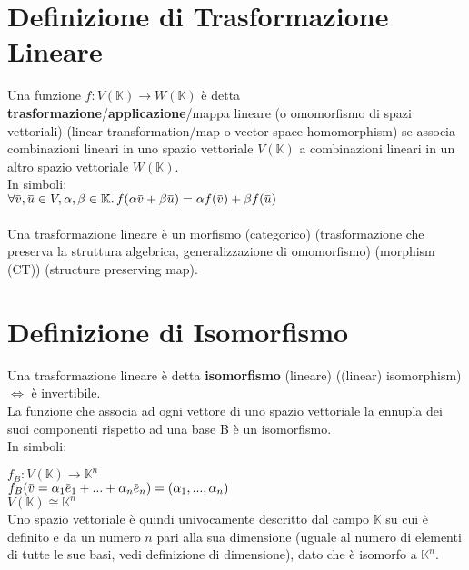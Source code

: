\documentclass[a4paper, twoside, italian, 11pt]{book}
\newcommand{\overbar}[1] {\mkern 1.5mu\overline{\mkern-1.5mu#1\mkern-1.5mu}\mkern 1.5mu}
\newcommand{\K}{\mathbb K}
\begin{document}



\section{Definizione di Trasformazione Lineare}

Una funzione $f : V(\K) \rightarrow W(\K)$ è detta \textbf{trasformazione}/\textbf{applicazione}/mappa lineare (o omomorfismo di spazi vettoriali) (linear transformation/map o vector space homomorphism) se associa combinazioni lineari in uno spazio vettoriale $V(\K)$ a combinazioni lineari in un altro spazio vettoriale $W(\K)$. \\

\noindent
In simboli: \\

$\forall \overbar v, \overbar u \in V, \alpha, \beta \in \K \ldotp f(\alpha \overbar v + \beta \overbar u) = \alpha f(\overbar v) + \beta f(\overbar u)$ \\\\

\noindent
Una trasformazione lineare è un morfismo (categorico) (trasformazione che preserva la struttura algebrica, generalizzazione di omomorfismo) (morphism (CT)) (structure preserving map).



\section{Definizione di Isomorfismo}

Una trasformazione lineare è detta \textbf{isomorfismo} (lineare) ((linear) isomorphism) $\iff$ è invertibile. \\

\noindent
La funzione che associa ad ogni vettore di uno spazio vettoriale la ennupla dei suoi componenti rispetto ad una base B è un isomorfismo. \\

\noindent
In simboli:

$f_B : V(\K) \rightarrow \K^n$ \\
\indent
$f_B(\overbar v = \alpha_1 \overbar e_1 + ... + \alpha_n \overbar e_n) = (\alpha_1, ..., \alpha_n)$ \\

$V(\K) \cong \K^n$ \\

\noindent
Uno spazio vettoriale è quindi univocamente descritto dal campo $\K$ su cui è definito e da un numero $n$ pari alla sua dimensione (uguale al numero di elementi di tutte le sue basi, vedi definizione di dimensione), dato che è isomorfo a $\K^n$. \\
\end{document}

